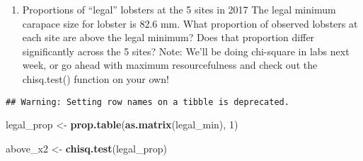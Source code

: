 \documentclass[]{article}
\newenvironment{Shaded}{\begin{snugshade}}{\end{snugshade}}
\newcommand{\KeywordTok}[1]{\textcolor[rgb]{0.13,0.29,0.53}{\textbf{{#1}}}}
\newcommand{\DataTypeTok}[1]{\textcolor[rgb]{0.13,0.29,0.53}{{#1}}}
\newcommand{\DecValTok}[1]{\textcolor[rgb]{0.00,0.00,0.81}{{#1}}}
\newcommand{\FloatTok}[1]{\textcolor[rgb]{0.00,0.00,0.81}{{#1}}}
\newcommand{\StringTok}[1]{\textcolor[rgb]{0.31,0.60,0.02}{{#1}}}
\newcommand{\CommentTok}[1]{\textcolor[rgb]{0.56,0.35,0.01}{\textit{{#1}}}}
\newcommand{\NormalTok}[1]{{#1}}
\providecommand{\tightlist}{%
  \setlength{\itemsep}{0pt}\setlength{\parskip}{0pt}}
\begin{document}
\begin{enumerate}
\def\labelenumi{\arabic{enumi}.}
\setcounter{enumi}{3}
\tightlist
\item
  Proportions of ``legal'' lobsters at the 5 sites in 2017 The legal
  minimum carapace size for lobster is 82.6 mm. What proportion of
  observed lobsters at each site are above the legal minimum? Does that
  proportion differ significantly across the 5 sites? Note: We'll be
  doing chi-square in labs next week, or go ahead with maximum
  resourcefulness and check out the chisq.test() function on your own!
\end{enumerate}

\begin{Shaded}
\end{Shaded}

\begin{verbatim}
## Warning: Setting row names on a tibble is deprecated.
\end{verbatim}

\begin{Shaded}
\begin{Highlighting}[]
\NormalTok{legal_prop <-}\StringTok{ }\KeywordTok{prop.table}\NormalTok{(}\KeywordTok{as.matrix}\NormalTok{(legal_min), }\DecValTok{1}\NormalTok{)}


\NormalTok{above_x2 <-}\StringTok{ }\KeywordTok{chisq.test}\NormalTok{(legal_prop)}
\end{Highlighting}
\end{Shaded}
\end{document}
